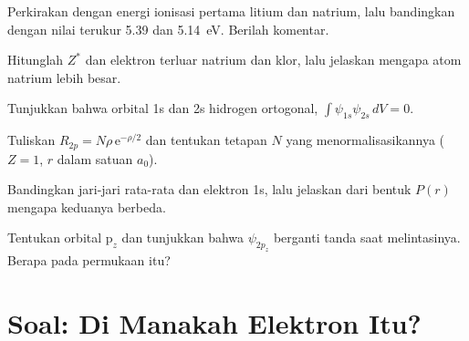 \begin{exercise}[$\star\star$]\label{exo:b2:atomic-orbitals:7}
Perkirakan dengan  energi ionisasi pertama litium dan
natrium, lalu bandingkan dengan nilai terukur 5.39 dan \qty{5.14}{eV}.
Berilah komentar.
\end{exercise}

\begin{exercise}[$\star\star$]\label{exo:b2:atomic-orbitals:8}
Hitunglah $Z^*$ dan  elektron terluar natrium dan klor,
lalu jelaskan mengapa atom natrium lebih besar.
\end{exercise}

\begin{exercise}[$\star\star$]\label{exo:b2:atomic-orbitals:9}
Tunjukkan bahwa orbital 1s dan 2s hidrogen ortogonal,
$\int\psi_{1s}\psi_{2s}\,dV = 0$.
\end{exercise}

\begin{exercise}[$\star\star\star$]\label{exo:b2:atomic-orbitals:10}
Tuliskan $R_{2p} = N\rho\,\mathrm e^{-\rho/2}$ dan tentukan tetapan $N$ yang
menormalisasikannya ($Z = 1$, $r$ dalam satuan $a_0$).
\end{exercise}

\begin{exercise}[$\star\star\star$]\label{exo:b2:atomic-orbitals:11}
Bandingkan jari-jari rata-rata dan  elektron 1s,
lalu jelaskan dari bentuk $P(r)$ mengapa keduanya berbeda.
\end{exercise}

\begin{exercise}[$\star\star\star$]\label{exo:b2:atomic-orbitals:12}
Tentukan  orbital $\mathrm p_z$ dan tunjukkan bahwa
$\psi_{2p_z}$ berganti tanda saat melintasinya. Berapa 
pada permukaan itu?
\end{exercise}

\section{Soal: Di Manakah Elektron Itu?}

